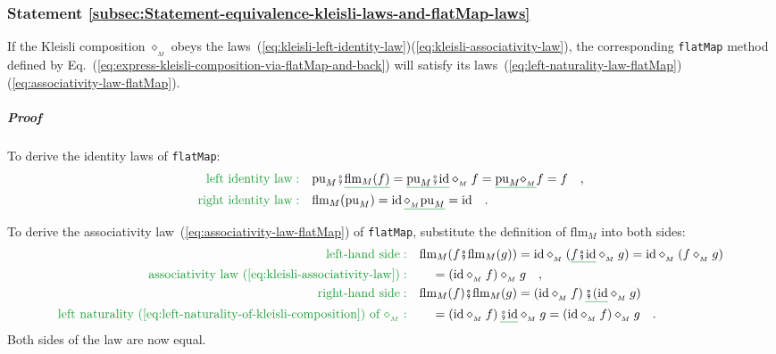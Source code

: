 \subsubsection{Statement \label{subsec:Statement-equivalence-kleisli-laws-and-flatMap-laws}\ref{subsec:Statement-equivalence-kleisli-laws-and-flatMap-laws}}

If the Kleisli composition $\diamond_{_{M}}$ obeys the laws~(\ref{eq:kleisli-left-identity-law})\textendash (\ref{eq:kleisli-associativity-law}),
the corresponding \lstinline!flatMap! method defined by Eq.~(\ref{eq:express-kleisli-composition-via-flatMap-and-back})
will satisfy its laws~(\ref{eq:left-naturality-law-flatMap})\textendash (\ref{eq:associativity-law-flatMap}).

\subparagraph{Proof}

To derive the identity laws of \lstinline!flatMap!:
\begin{align*}
{\color{greenunder}\text{left identity law}:}\quad & \text{pu}_{M}\bef\gunderline{\text{flm}_{M}(f)}=\gunderline{\text{pu}_{M}\bef\text{id}}\diamond_{_{M}}f=\gunderline{\text{pu}_{M}\diamond_{_{M}}}f=f\quad,\\
{\color{greenunder}\text{right identity law}:}\quad & \text{flm}_{M}(\text{pu}_{M})=\text{id}\,\gunderline{\diamond_{_{M}}\text{pu}_{M}}=\text{id}\quad.
\end{align*}

To derive the associativity law~(\ref{eq:associativity-law-flatMap})
of \lstinline!flatMap!, substitute the definition of $\text{flm}_{M}$
into both sides:
\begin{align*}
{\color{greenunder}\text{left-hand side}:}\quad & \text{flm}_{M}(f\bef\text{flm}_{M}(g))=\text{id}\diamond_{_{M}}(\gunderline{f\bef\text{id}}\diamond_{_{M}}g)=\text{id}\diamond_{_{M}}(f\diamond_{_{M}}g)\\
{\color{greenunder}\text{associativity law~(\ref{eq:kleisli-associativity-law})}:}\quad & \quad=(\text{id}\diamond_{_{M}}f)\diamond_{_{M}}g\quad,\\
{\color{greenunder}\text{right-hand side}:}\quad & \text{flm}_{M}(f)\bef\text{flm}_{M}(g)=(\text{id}\diamond_{_{M}}f)\,\gunderline{\bef(\text{id}}\diamond_{_{M}}g)\\
{\color{greenunder}\text{left naturality~(\ref{eq:left-naturality-of-kleisli-composition}) of }\diamond_{_{M}}:}\quad & \quad=(\text{id}\diamond_{_{M}}f)\,\gunderline{\bef\text{id}}\diamond_{_{M}}g=(\text{id}\diamond_{_{M}}f)\diamond_{_{M}}g\quad.
\end{align*}
Both sides of the law are now equal.

